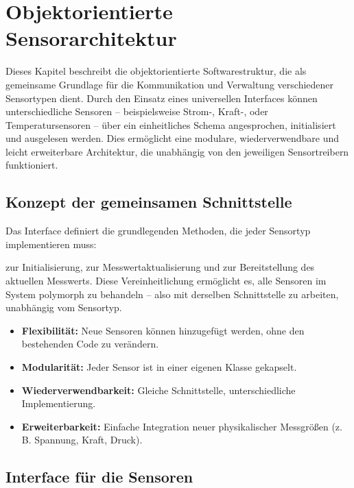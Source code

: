 %
%

\chapter{Objektorientierte Sensorarchitektur}

Dieses Kapitel beschreibt die objektorientierte Softwarestruktur, die als gemeinsame Grundlage für die Kommunikation und Verwaltung verschiedener Sensortypen dient. Durch den Einsatz eines universellen Interfaces können unterschiedliche Sensoren – beispielsweise Strom-, Kraft-, oder Temperatursensoren – über ein einheitliches Schema angesprochen, initialisiert und ausgelesen werden. Dies ermöglicht eine modulare, wiederverwendbare und leicht erweiterbare Architektur, die unabhängig von den jeweiligen Sensortreibern funktioniert.
	
\section{Konzept der gemeinsamen Schnittstelle}
	
Das Interface  definiert die grundlegenden Methoden, die jeder Sensortyp implementieren muss: 

 zur Initialisierung,  zur Messwertaktualisierung und  zur Bereitstellung des aktuellen Messwerts. Diese Vereinheitlichung ermöglicht es, alle Sensoren im System polymorph zu behandeln – also mit derselben Schnittstelle zu arbeiten, unabhängig vom Sensortyp. 
	
\begin{itemize}
	\item \textbf{Flexibilität:} Neue Sensoren können hinzugefügt werden, ohne den bestehenden Code zu verändern.
		\item \textbf{Modularität:} Jeder Sensor ist in einer eigenen Klasse gekapselt.
		\item \textbf{Wiederverwendbarkeit:} Gleiche Schnittstelle, unterschiedliche Implementierung.
		\item \textbf{Erweiterbarkeit:} Einfache Integration neuer physikalischer Messgrö{\ss}en (z. B. Spannung, Kraft, Druck).
\end{itemize}
	
\section{Interface für die Sensoren}

